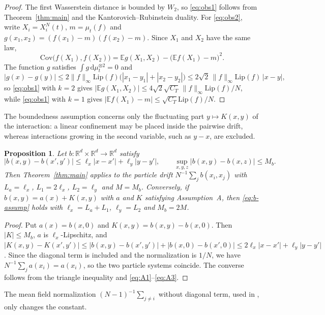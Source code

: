 \documentclass[11pt]{amsart}
\numberwithin{equation}{section}
\theoremstyle{plain}
\newtheorem{proposition}[theorem]{Proposition}
\theoremstyle{remark}
\newcommand{\R}{\mathbb{R}}
\newcommand{\E}{\mathbb{E}}
\newcommand{\W}{W_2}
\newcommand{\Lip}{\mathrm{Lip}}
\newcommand{\dd}{\mathrm{d}}
\begin{document}
\begin{proof}
The first Wasserstein distance is bounded by $\W$, so \eqref{eq:obs1} follows from Theorem~\ref{thm:main} and the Kantorovich--Rubinstein duality. For \eqref{eq:obs2}, write $X_i=X^N_i(t)$, $m=\mu_t(f)$ and $g(x_1,x_2)=(f(x_1)-m)(f(x_2)-m)$. Since $X_1$ and $X_2$ have the same law,
\[
\mathrm{Cov}\big(f(X_1),f(X_2)\big)=\E g(X_1,X_2)-\big(\E f(X_1)-m\big)^2.
\]
The function $g$ satisfies $\int g\,\dd\mu_t^{\otimes2}=0$ and
\[
|g(x)-g(y)|\le2\|f\|_\infty\Lip(f)\big(|x_1-y_1|+|x_2-y_2|\big)\le2\sqrt2\,\|f\|_\infty\Lip(f)\,|x-y|,
\]
so \eqref{eq:obs1} with $k=2$ gives $|\E g(X_1,X_2)|\le4\sqrt2\sqrt{C_T}\,\|f\|_\infty\Lip(f)/N$, while \eqref{eq:obs1} with $k=1$ gives $|\E f(X_1)-m|\le\sqrt{C_T}\Lip(f)/N$.
\end{proof}

The boundedness assumption concerns only the fluctuating part $y\mapsto K(x,y)$ of the interaction: a linear confinement may be placed inside the pairwise drift, whereas interactions growing in the second variable, such as $y-x$, are excluded.

\begin{proposition}\label{prop:intrinsic}
Let $b\colon\R^d\times\R^d\to\R^d$ satisfy
\begin{equation}\label{eq:b-assump}
|b(x,y)-b(x',y')|\le\ell_x|x-x'|+\ell_y|y-y'|,\qquad \sup_{x,y,z}|b(x,y)-b(x,z)|\le M_b.
\end{equation}
Then Theorem~\ref{thm:main} applies to the particle drift $N^{-1}\sum_jb(x_i,x_j)$ with $L_a=\ell_x$, $L_1=2\ell_x$, $L_2=\ell_y$ and $M=M_b$. Conversely, if $b(x,y)=a(x)+K(x,y)$ with $a$ and $K$ satisfying Assumption~A, then \eqref{eq:b-assump} holds with $\ell_x=L_a+L_1$, $\ell_y=L_2$ and $M_b=2M$.
\end{proposition}

\begin{proof}
Put $a(x)=b(x,0)$ and $K(x,y)=b(x,y)-b(x,0)$. Then $|K|\le M_b$, $a$ is $\ell_x$-Lipschitz, and $|K(x,y)-K(x',y')|\le|b(x,y)-b(x',y')|+|b(x,0)-b(x',0)|\le2\ell_x|x-x'|+\ell_y|y-y'|$. Since the diagonal term is included and the normalization is $1/N$, we have $N^{-1}\sum_ja(x_i)=a(x_i)$, so the two particle systems coincide. The converse follows from the triangle inequality and \eqref{eq:A1}--\eqref{eq:A3}.
\end{proof}

The mean field normalization $(N-1)^{-1}\sum_{j\ne i}$ without diagonal term, used in \cite{Lac23}, only changes the constant.
\end{document}

